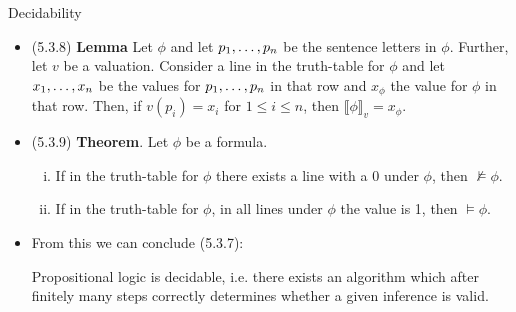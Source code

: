 \documentclass[../slides.tex]{subfiles}
\begin{document}
\begin{frame}{Decidability}
	
	\begin{itemize}
	
		\item (5.3.8) \textbf{Lemma} Let $\phi$ and let $p_1, \mathellipsis, p_n$ be the sentence letters in $\phi$. Further, let $v$ be a valuation. Consider a line in the truth-table for $\phi$ and let $x_1, \mathellipsis, x_n$ be the values for $p_1, \mathellipsis, p_n$ in that row and $x_\phi$ the value for $\phi$ in that row. Then, if $v(p_i)=x_i$ for $1\leq i\leq n$, then $\llbracket \phi\rrbracket_v=x_\phi$.


		\item (5.3.9) \textbf{Theorem}. Let $\phi$ be a formula.
		
		\begin{enumerate}[(i)]
		
			\item  If in the truth-table for $\phi$ there exists a line with a 0 under $\phi$, then $\nvDash\phi$.
			
			\item  If in the truth-table for $\phi$, in all lines under $\phi$ the value is 1, then $\vDash\phi$.
		
		\end{enumerate}
		
		\item From this we can conclude (5.3.7):
		
		\begin{theorem}
	Propositional logic is decidable, i.e. there exists an algorithm which after finitely many steps correctly determines whether a given inference is valid.
	\end{theorem}

	
	\end{itemize}

\end{frame}
\end{document}
